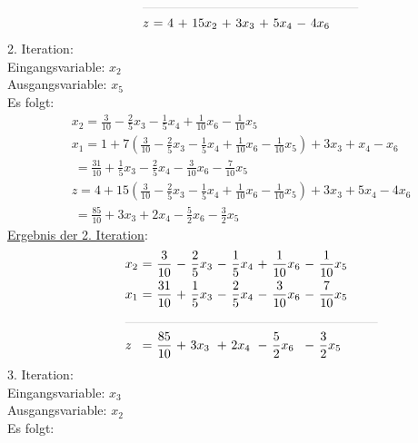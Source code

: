 \documentclass [a4paper,11pt]{article}
\begin{document}
\begin{enumerate}
\begin{align*}
\begin{alignedat}{6}
            &\rlap{\rule{6cm}{.1pt}} &&&&&&&&&&\\
            & z   &\ = &\ 4 &\ + &\ 15x_2 &\ + &\ 3x_3 &\ + &\ 5x_4 &\ - &\ 4x_6
            \end{alignedat}
            \end{align*}
            2. Iteration:\\
            Eingangsvariable: $x_2$\\
            Ausgangsvariable: $x_5$\\
            Es folgt:
            \begin{align*}
            & x_2 = \frac{3}{10} - \frac{2}{5}x_3 - \frac{1}{5}x_4 + \frac{1}{10}x_6 - \frac{1}{10}x_5\\
            & x_1 = 1 + 7 \left( \frac{3}{10} - \frac{2}{5}x_3 - \frac{1}{5}x_4 + \frac{1}{10}x_6 - \frac{1}{10}x_5 \right) + 3x_3 + x_4 - x_6\\
            &   \ = \frac{31}{10} + \frac{1}{5}x_3 - \frac{2}{5}x_4 - \frac{3}{10}x_6 - \frac{7}{10}x_5\\
            &   z = 4 + 15 \left( \frac{3}{10} - \frac{2}{5}x_3 - \frac{1}{5}x_4 + \frac{1}{10}x_6 - \frac{1}{10}x_5 \right) + 3x_3 + 5x_4 - 4x_6\\
            &   \ = \frac{85}{10} + 3x_3 + 2x_4 - \frac{5}{2}x_6 - \frac{3}{2}x_5
            \end{align*}
            \underline{Ergebnis der 2. Iteration}:
            \begin{align*}
            \begin{alignedat}{6}
            & x_2 &\ = &\  \frac{3}{10} &\ - &\ \frac{2}{5}x_3 &\ - &\ \frac{1}{5}x_4 &\ + &\ \frac{1}{10}x_6 &\ - &\ \frac{1}{10}x_5 \\
            & x_1 &\ = &\ \frac{31}{10} &\ + &\ \frac{1}{5}x_3 &\ - &\ \frac{2}{5}x_4 &\ - &\ \frac{3}{10}x_6 &\ - &\ \frac{7}{10}x_5 \\
            &\rlap{\rule{7cm}{.1pt}} &&&&&&&&&&\\
            & z   &\ = &\ \frac{85}{10} &\ + &\           3x_3 &\ + &\           2x_4 &\ - &\  \frac{5}{2}x_6 &\ - &\ \frac{3}{2}x_5
            \end{alignedat}
            \end{align*}
            3. Iteration:\\
            Eingangsvariable: $x_3$\\
            Ausgangsvariable: $x_2$\\
            Es folgt:
            \begin{align*}

\end{align*}
\end{enumerate}
\end{document}
